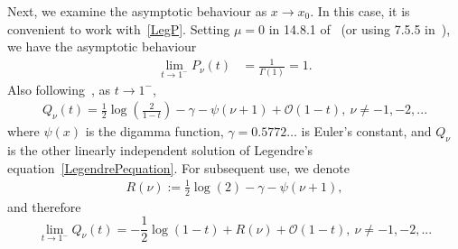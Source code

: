\documentclass[final]{siamltex}
\newcommand{\bigO} {\mathcal{O}}
\begin{document}
Next, we examine the asymptotic behaviour as $x\rightarrow x_0$. In this
case, it is convenient to work with~\eqref{LegP}. Setting $\mu=0$ in
14.8.1 of~\cite{fatAbramowitz} (or using 7.5.5 in~\cite{lebedev}), we have the asymptotic behaviour
\begin{align} 
  \label{Pasymptotics}
  \lim_{t\rightarrow 1^- } P_\nu(t)&= \frac{1}{\Gamma(1)}=1.
\end{align}
Also following~\cite{fatAbramowitz}, as $t\rightarrow 1^{-}$,
\begin{align*}
  Q_{\nu}(t)=\frac{1}{2}\log\left(\frac{2}{1-t}\right)-\gamma
  -\psi(\nu+1)+\bigO(1-t),\: \nu \neq -1,-2,...
\end{align*} 
where $\psi(x)$ is the digamma function, $\gamma=0.5772\ldots$ is
Euler's constant, and $Q_{\nu}$ is the other linearly independent
solution of Legendre's equation~\eqref{LegendrePequation}.  For
subsequent use, we denote 
\begin{align*}
  R(\nu):= \frac{1}{2}\log(2) -\gamma -\psi(\nu+1), 
\end{align*}
and therefore
\begin{equation}
  \label{Qasymptotics}
  \lim_{t\rightarrow 1^-}Q_{\nu}(t)=-\frac{1}{2}\log(1-t) + 
  R(\nu) + \bigO(1-t),\: \nu \neq -1,-2,... 
\end{equation}
\end{document}
